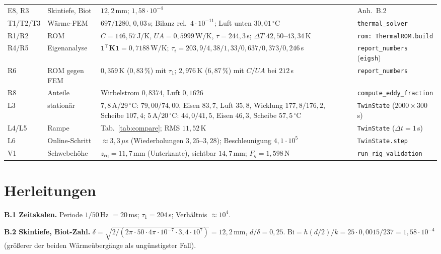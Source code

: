 \documentclass[a4paper, 10pt, conference]{ieeeconf}
\theoremstyle{remark}
\begin{document}
\begin{table}[t]
\begin{tabularx}{\textwidth}{@{}l l X l@{}}
E8, R3 & Skintiefe, Biot & $12{,}2\,$mm; $1{,}58\cdot10^{-4}$ & Anh.~B.2 \\
T1/T2/T3 & Wärme-FEM & $697/1280$, $0{,}03\,$s; Bilanz rel.\ $4\cdot10^{-11}$; Luft unten $30{,}01\,^\circ$C & \texttt{thermal\_solver} \\
R1/R2 & ROM & $C=146{,}57\,$J/K, $UA=0{,}5999\,$W/K, $\tau=244{,}3\,$s; $\Delta T$ $42{,}50$--$43{,}34\,$K & \texttt{rom: ThermalROM.build} \\
R4/R5 & Eigenanalyse & $\mathbf 1^{\!\top}\mathbf K\mathbf 1=0{,}7188\,$W/K; $\tau_i=203{,}9/4{,}38/1{,}33/0{,}637/0{,}373/0{,}246\,$s & \texttt{report\_numbers} (\texttt{eigsh}) \\
R6 & ROM gegen FEM & $0{,}359\,$K ($0{,}83\,\%$) mit $\tau_1$; $2{,}976\,$K ($6{,}87\,\%$) mit $C/UA$ bei $212\,$s & \texttt{report\_numbers} \\
R8 & Anteile & Wirbelstrom $0{,}8374$, Luft $0{,}1626$ & \texttt{compute\_eddy\_fraction} \\
L3 & stationär & $7{,}8\,$A/$29\,^\circ$C: $79{,}00/74{,}00$, Eisen $83{,}7$, Luft $35{,}8$, Wicklung $177{,}8/176{,}2$, Scheibe $107{,}4$; $5\,$A/$20\,^\circ$C: $44{,}0/41{,}5$, Eisen $46{,}3$, Scheibe $57{,}5\,^\circ$C & \texttt{TwinState} ($2000\times300\,$s) \\
L4/L5 & Rampe & Tab.~\ref{tab:compare}; RMS $11{,}52\,$K & \texttt{TwinState} ($\Delta t=1\,$s) \\
L6 & Online-Schritt & $\approx3{,}3\,\mu$s (Wiederholungen $3{,}25$--$3{,}28$); Beschleunigung $4{,}1\cdot10^5$ & \texttt{TwinState.step} \\
V1 & Schwebehöhe & $z_{\mathrm{eq}}=11{,}7\,$mm (Unterkante), sichtbar $14{,}7\,$mm; $F_g=1{,}598\,$N & \texttt{run\_rig\_validation} \\
\bottomrule
\end{tabularx}
\end{table}

\section{Herleitungen}
\label{app:derive}

\textbf{B.1 Zeitskalen.} Periode $1/50\,$Hz $=20\,$ms; $\tau_1=204\,$s;
Verhältnis $\approx10^4$.

\textbf{B.2 Skintiefe, Biot-Zahl.}
$\delta=\sqrt{2/(2\pi\cdot50\cdot4\pi\cdot10^{-7}\cdot3{,}4\cdot10^7)}=12{,}2\,$mm,
$d/\delta=0{,}25$. $\mathrm{Bi}=h(d/2)/k=25\cdot0{,}0015/237=1{,}58\cdot10^{-4}$
(größerer der beiden Wärmeübergänge als ungünstigster Fall).
\end{document}
